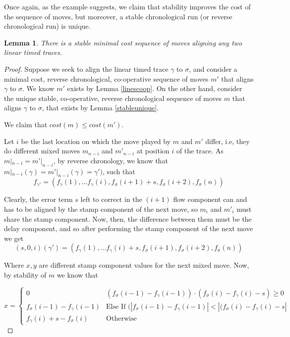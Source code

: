 \documentclass{article}
\newcounter{cases}
\newtheorem{lemma}[theorem]{Lemma}
\theoremstyle{Definition}
\theoremstyle{definition}
\begin{document}
	Once again, as the example suggests, we claim that stability improves the cost of the sequence of moves, but moreover, a stable chronological run (or reverse chronological run) is unique.  
	
	\begin{lemma}\label{stablebest} There is a stable minimal cost sequence of moves aligning any two linear timed traces. 
	\end{lemma}
	
	\begin{proof}
		Suppose we seek to align the linear timed trace $\gamma$ to $\sigma$, and consider a minimal cost, reverse chronological, co-operative sequence of moves $m'$ that aligns $\gamma$ to $\sigma$. 
		We know $m'$ exists by Lemma \ref{linescoop}. 
		On the other hand, consider the unique stable, co-operative, reverse chronological sequence of moves $m$ that aligns $\gamma$ to $\sigma$, that exists by Lemma \ref{stableunique}. 
		
		We claim that $cost(m) \leq cost(m')$. 
		
		Let $i$ be the last location on which the move played by $m$ and $m'$ differ, i.e, they do different mixed moves $m_{n-i}$ and $m'_{n-i}$ at position $i$ of the trace. As $m|_{n-i} = m'|_{n-i}$, by reverse chronology, we know that $m|_{n-i}(\gamma) = m'|_{n-i}(\gamma) = \gamma')$, such that $$f_{\gamma'} = (f_\gamma(1), \dots f_{\gamma}(i) , f_\sigma(i+1) + s, f_\sigma(i+2), f_\sigma(n))$$
		
		Clearly, the error term $s$ left to correct in the $(i+1)$ flow component can and has to be aligned by the stamp component of the next move, so $m_i$ and $m'_i$ must share the stamp component. Now, then, the difference between them must be the delay component, and so after performing the stamp component of the next move we get $$(s, 0, i)(\gamma') = (f_\gamma(1), \dots f_{\gamma}(i) + s , f_\sigma(i+1), f_\sigma(i+2), f_\sigma(n))$$
		
		Where $x, y$ are different stamp component values for the next mixed move. Now, by stability of $m$ we know that 
		
			$$x = \begin{cases}
			0 & (f_\sigma(i-1) - f_\gamma(i-1))\cdot (f_\sigma(i) - f_\gamma(i) - s) \geq 0 \\
			f_\sigma(i-1) - f_\gamma(i-1) & \textrm{Else If }(|f_\sigma(i-1) - f_\gamma(i-1)| < |(f_\sigma(i) - f_\gamma(i) - s| \\
			f_\gamma(i) + s - f_\sigma(i) & \textrm{Otherwise}
		\end{cases}$$
	

\end{proof}
\end{document}
